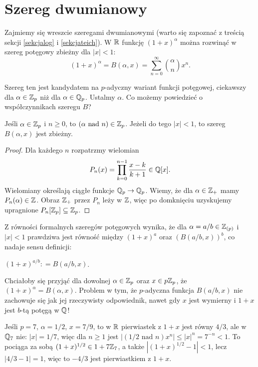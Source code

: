 \section{Szereg dwumianowy}
Zajmiemy się wreszcie szeregami dwumianowymi (warto się zapoznać z treścią sekcji \ref{sekcjalog} i \ref{sekcjateich}).
W $\mathbb R$ funkcję $(1+x)^\alpha$ można rozwinąć w szereg potęgowy zbieżny dla $|x| < 1$:
\[
	(1+x)^\alpha = B(\alpha, x) = \sum_{n = 0}^\infty {\alpha \choose n} x^n.
\]

Szereg ten jest kandydatem na $p$-adyczny wariant funkcji potęgowej, ciekawszy dla $\alpha \in \mathbb Z_p$ niż dla $\alpha \in \mathbb Q_p$.
Ustalmy $\alpha$.
Co możemy powiedzieć o współczynnikach szeregu $B$?

\begin{fakt}
	Jeśli $\alpha \in \mathbb Z_p$ i $n \ge 0$, to $(\alpha \textrm{ nad } n) \in \mathbb Z_p$.
	Jeżeli do tego $|x| < 1$, to szereg $B(\alpha, x)$ jest zbieżny.
\end{fakt}

\begin{proof}
	Dla każdego $n$ rozpatrzmy wielomian
	\[
		P_n(x) = \prod_{k = 0}^{n-1} \frac{x - k}{k+1} \in \mathbb Q[x].
	\]
	Wielomiany określają ciągłe funkcje $\mathbb Q_p \to \mathbb Q_p$.
	Wiemy, że dla $\alpha \in \mathbb Z_+$ mamy $P_n(\alpha) \in \mathbb Z$.
	Obraz $\mathbb Z_+$ przez $P_n$ leży w $\mathbb Z$, więc po domknięciu uzyskujemy upragnione  $P_n[\mathbb Z_p] \subseteq \mathbb Z_p$.
\end{proof}

Z równości formalnych szeregów potęgowych wynika, że dla $\alpha = a/b \in \mathbb Z_{(p)}$ i $|x| < 1$ prawdziwa jest równość między $(1+x)^a$ oraz $(B(a/b, x))^b$, co nadaje sensu definicji:

\begin{definicja}
	$(1 + x)^{a/b} : = B(a/b, x)$.
\end{definicja}

Chciałoby się przyjąć dla dowolnej $\alpha \in \mathbb Z_p$ oraz $x \in p\mathbb Z_p$, że $(1+x)^\alpha = B(\alpha, x)$.
Problem w tym, że $p$-adyczna funkcja $B(a/b, x)$ nie zachowuje się jak jej rzeczywisty odpowiednik, nawet gdy $x$ jest wymierny i $1+x$ jest $b$-tą potęgą w $\mathbb Q$!

\begin{przyklad}[Koblitz]
	Jeśli $p = 7$, $\alpha = 1/2$, $x = 7/9$, to w $\mathbb R$ pierwiastek z $1+x$ jest równy $4/3$, ale w $\mathbb Q_7$ nie: $|x| = 1/7$, więc dla $n \ge 1$ jest $|(1/2 \textrm{ nad } n) x^n| \le |x|^n = 7^{-n} < 1$.
	To pociąga za sobą $(1+ x)^{1/2} \in 1 + 7 \mathbb Z_7$, a także $|(1+x)^{1/2} - 1| < 1$, lecz $|4/3 - 1| = 1$, więc to $-4/3$ jest pierwiastkiem z $1+x$.
\end{przyklad}

